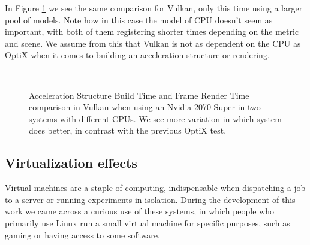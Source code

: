 In Figure \ref{vulkan-2070-super-comparison} we see the same comparison for Vulkan, only this time using a larger pool of models. Note how in this case the model of CPU doesn't seem as important, with both of them registering shorter times depending on the metric and scene. We assume from this that Vulkan is not as dependent on the CPU as OptiX when it comes to building an acceleration structure or rendering.

\begin{figure}
    \\
    \caption{Acceleration Structure Build Time and Frame Render Time comparison in Vulkan when using an Nvidia 2070 Super in two systems with different CPUs. We see more variation in which system does better, in contrast with the previous OptiX test.}
    \label{vulkan-2070-super-comparison}
\end{figure}


\clearpage
\subsection{Virtualization effects}
Virtual machines are a staple of computing, indispensable when dispatching a job to a server or running experiments in isolation. During the development of this work we came across a curious use of these systems, in which people who primarily use Linux run a small virtual machine for specific purposes, such as gaming or having access to some software. 

